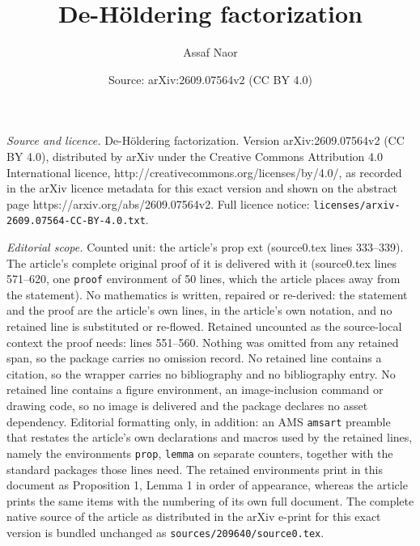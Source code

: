 \documentclass[10pt,a4paper]{amsart}
\title{De-H\"oldering factorization}
\author{Assaf Naor}
\date{Source: arXiv:2609.07564v2 (CC BY 4.0)}
\begin{document}
\maketitle

\noindent\emph{Source and licence.} De-H\"oldering factorization. Version arXiv:2609.07564v2 (CC BY 4.0), distributed by arXiv under the Creative Commons Attribution 4.0 International licence, http://creativecommons.org/licenses/by/4.0/, as recorded in the arXiv licence metadata for this exact version and shown on the abstract page https://arxiv.org/abs/2609.07564v2. Full licence notice: \texttt{licenses/arxiv-2609.07564-CC-BY-4.0.txt}.\par\smallskip

\noindent\textit{Editorial scope.} Counted unit: the article's prop ext (source0.tex lines 333--339). The article's complete original proof of it is delivered with it (source0.tex lines 571--620, one \texttt{proof} environment of 50 lines, which the article places away from the statement). No mathematics is written, repaired or re-derived: the statement and the proof are the article's own lines, in the article's own notation, and no retained line is substituted or re-flowed.  Retained uncounted as the source-local context the proof needs: lines 551--560.  Nothing was omitted from any retained span, so the package carries no omission record.  No retained line contains a citation, so the wrapper carries no bibliography and no bibliography entry.  No retained line contains a figure environment, an image-inclusion command or drawing code, so no image is delivered and the package declares no asset dependency.  Editorial formatting only, in addition: an AMS \texttt{amsart} preamble that restates the article's own declarations and macros used by the retained lines, namely the environments \texttt{prop}, \texttt{lemma} on separate counters, together with the standard packages those lines need.  The retained environments print in this document as Proposition 1, Lemma 1 in order of appearance, whereas the article prints the same items with the numbering of its own full document.  The complete native source of the article as distributed in the arXiv e-print for this exact version is bundled unchanged as \texttt{sources/209640/source0.tex}.
\end{document}
